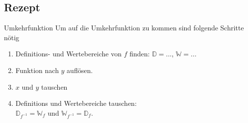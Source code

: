 \subsection{Rezept}
\begin{rezept}{Umkehrfunktion}{}
  Um auf die Umkehrfunktion zu kommen sind folgende Schritte nötig
  \begin{enumerate}
  \item Definitions- und Wertebereiche von $f$ finden: $\mathbb{D} =
    ...$, $\mathbb{W} = ...$
  \item Funktion nach $y$ auflösen.
  \item $x$ und $y$ tauschen
  \item Definitions und Wertebereiche tauschen:\\
    $\mathbb{D}_{f^{-1}} = \mathbb{W}_f$ und  
    $\mathbb{W}_{f^{-1}} = \mathbb{D}_f$.
    \end{enumerate} 
  \end{rezept}
\newpage%
